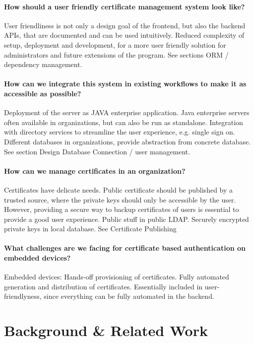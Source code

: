 \subsubsection*{How should a user friendly certificate management system look like?}
User friendliness is not only a design goal of the frontend, but also the backend APIs, that are documented and can be
used intuitively.
Reduced complexity of setup, deployment and development, for a more user friendly solution for administrators and future
extensions of the program.
See sections ORM / dependency management.

\subsubsection*{How can we integrate this system in existing workflows to make it as accessible as possible?}
Deployment of the server as JAVA enterprise application.
Java enterprise servers often available in organizations, but can also be run as standalone.
Integration with directory services to streamline the user experience, e.g. single sign on.
Different databases in organizations, provide abstraction from concrete database.
See section Design Database Connection / user management.

\subsubsection*{How can we manage certificates in an organization?}
Certificates have delicate needs. Public certificate should be published by a trusted source, where the private keys
should only be accessible by the user. However, providing a secure way to backup certificates of users is essential to
provide a good user experience. Public stuff in public LDAP. Securely encrypted private keys in local database. See
Certificate Publishing

\subsubsection*{What challenges are we facing for certificate based authentication on embedded devices?}
Embedded devices: Hands-off provisioning of certificates. Fully automated generation and distribution of certificates.
Essentially included in user-friendlyness, since everything can be fully automated in the backend.


\chapter{Background \& Related Work}\label{ch:backgroundRelatedWork}
